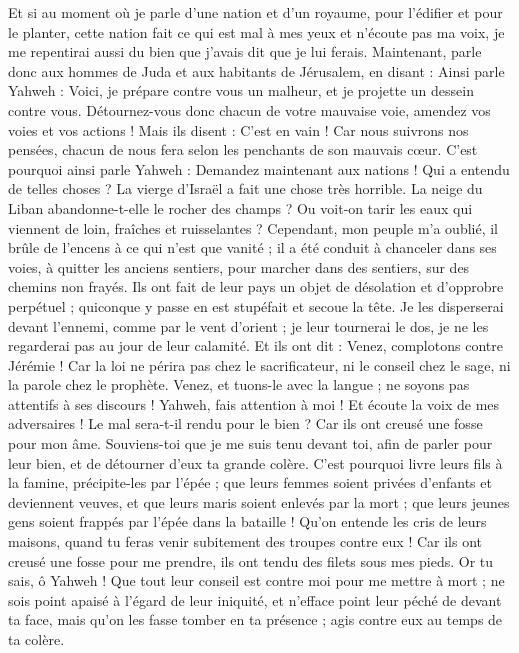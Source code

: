 \begin{multicols}{2}
Et si au moment où je parle d'une nation et d'un royaume, pour l'édifier et pour le planter,
cette nation fait ce qui est mal à mes yeux et n'écoute pas ma voix, je me repentirai aussi du bien que j'avais dit que je lui ferais.
Maintenant, parle donc aux hommes de Juda et aux habitants de Jérusalem, en disant : Ainsi parle Yahweh : Voici, je prépare contre vous un malheur, et je projette un dessein contre vous. Détournez-vous donc chacun de votre mauvaise voie, amendez vos voies et vos actions !
Mais ils disent : C'est en vain ! Car nous suivrons nos pensées, chacun de nous fera selon les penchants de son mauvais cœur.
C'est pourquoi ainsi parle Yahweh : Demandez maintenant aux nations ! Qui a entendu de telles choses ? La vierge d'Israël a fait une chose très horrible.
La neige du Liban abandonne-t-elle le rocher des champs ? Ou voit-on tarir les eaux qui viennent de loin, fraîches et ruisselantes ?
Cependant, mon peuple m'a oublié, il brûle de l'encens à ce qui n'est que vanité ; il a été conduit à chanceler dans ses voies, à quitter les anciens sentiers, pour marcher dans des sentiers, sur des chemins non frayés.
Ils ont fait de leur pays un objet de désolation et d'opprobre perpétuel ; quiconque y passe en est stupéfait et secoue la tête.
Je les disperserai devant l'ennemi, comme par le vent d'orient ; je leur tournerai le dos, je ne les regarderai pas au jour de leur calamité.
Et ils ont dit : Venez, complotons contre Jérémie ! Car la loi ne périra pas chez le sacrificateur, ni le conseil chez le sage, ni la parole chez le prophète. Venez, et tuons-le avec la langue ; ne soyons pas attentifs à ses discours !
Yahweh, fais attention à moi ! Et écoute la voix de mes adversaires !
Le mal sera-t-il rendu pour le bien ? Car ils ont creusé une fosse pour mon âme. Souviens-toi que je me suis tenu devant toi, afin de parler pour leur bien, et de détourner d'eux ta grande colère.
C'est pourquoi livre leurs fils à la famine, précipite-les par l'épée ; que leurs femmes soient privées d'enfants et deviennent veuves, et que leurs maris soient enlevés par la mort ; que leurs jeunes gens soient frappés par l'épée dans la bataille !
Qu'on entende les cris de leurs maisons, quand tu feras venir subitement des troupes contre eux ! Car ils ont creusé une fosse pour me prendre, ils ont tendu des filets sous mes pieds.
Or tu sais, ô Yahweh ! Que tout leur conseil est contre moi pour me mettre à mort ; ne sois point apaisé à l'égard de leur iniquité, et n'efface point leur péché de devant ta face, mais qu'on les fasse tomber en ta présence ; agis contre eux au temps de ta colère.

\end{multicols}
